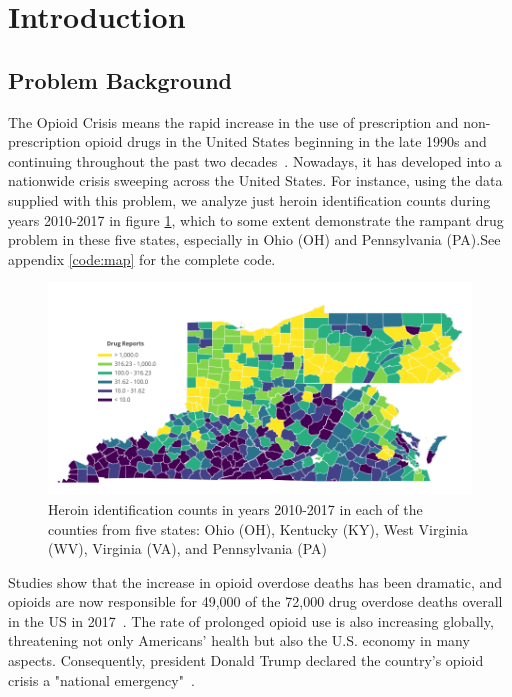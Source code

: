 \documentclass{mcmthesis}
\begin{document}
\maketitle

\tableofcontents

\newpage

\section{Introduction}	
\subsection{Problem Background}
The Opioid Crisis means the rapid increase in the use of prescription and non-prescription opioid drugs in the United States beginning in the late 1990s and continuing throughout the past two decades~\cite{op}. Nowadays, it has developed into a nationwide crisis sweeping across the United States. For instance, using the data supplied with this problem, we analyze just heroin identification counts during years 2010-2017 in figure \ref{situation}, which to some extent demonstrate the rampant drug problem in these five states, especially in Ohio (OH) and Pennsylvania (PA).See appendix \ref{code:map} for the complete code. 

\begin{figure}[htbp]
	\centering 
	\includegraphics[width=1\linewidth]{../figure/test.png}  
	\caption{Heroin identification counts in years 2010-2017 in each of the counties from five states: Ohio (OH), Kentucky (KY), West Virginia (WV), Virginia (VA), and Pennsylvania (PA)} 
	\label{situation}  
\end{figure}

Studies show that the increase in opioid overdose deaths has been dramatic, and opioids are now responsible for 49,000 of the 72,000 drug overdose deaths overall in the US in 2017~\cite{NIH}. The rate of prolonged opioid use is also increasing globally, threatening not only Americans' health but also the U.S. economy in many aspects. Consequently, president Donald Trump declared the country's opioid crisis a "national emergency"~\cite{Trump}.
\end{document}
